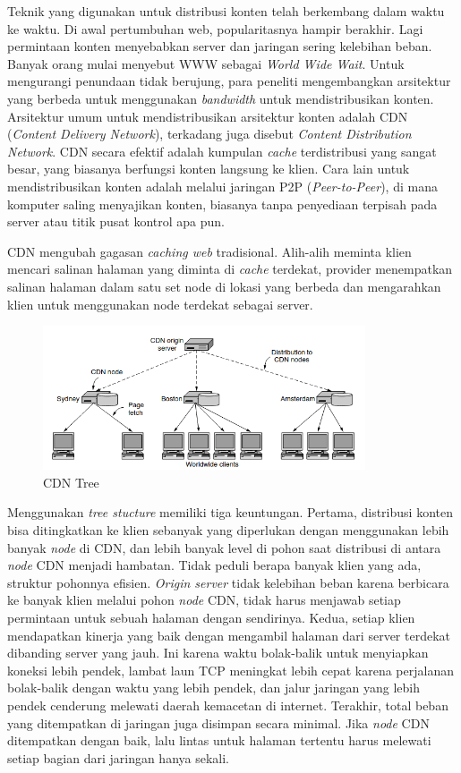 Teknik yang digunakan untuk distribusi konten telah berkembang dalam waktu ke waktu. Di awal pertumbuhan web, popularitasnya hampir berakhir. Lagi permintaan konten menyebabkan server dan jaringan sering kelebihan beban. Banyak orang mulai menyebut WWW sebagai \emph{World Wide Wait}. Untuk mengurangi penundaan tidak berujung, para peneliti mengembangkan arsitektur yang berbeda untuk menggunakan \emph{bandwidth} untuk mendistribusikan konten. Arsitektur umum untuk mendistribusikan arsitektur konten adalah CDN (\emph{Content Delivery Network}), terkadang juga disebut \emph{Content Distribution Network}. CDN secara efektif adalah kumpulan \emph{cache} terdistribusi yang sangat besar, yang biasanya berfungsi konten langsung ke klien. Cara lain untuk mendistribusikan konten adalah melalui jaringan P2P (\emph{Peer-to-Peer}), di mana komputer saling menyajikan konten, biasanya tanpa penyediaan terpisah pada server atau titik pusat kontrol apa pun. 

CDN mengubah gagasan \emph{caching web} tradisional. Alih-alih meminta klien mencari salinan halaman yang diminta di \emph{cache} terdekat, provider menempatkan salinan halaman dalam satu set node di lokasi yang berbeda dan mengarahkan klien untuk menggunakan node terdekat sebagai server.

\begin{figure}[H]
  \centering{}
	\includegraphics[width=0.85\textwidth]{gambar/CDN_distribution_tree}
  \caption{CDN Tree}
\end{figure}

Menggunakan \emph{tree stucture} memiliki tiga keuntungan. Pertama, distribusi konten bisa ditingkatkan ke klien sebanyak yang diperlukan dengan menggunakan lebih banyak \emph{node} di CDN, dan lebih banyak level di pohon saat distribusi di antara \emph{node} CDN menjadi hambatan. Tidak peduli berapa banyak klien yang ada, struktur pohonnya efisien. \emph{Origin server} tidak kelebihan beban karena berbicara ke banyak klien melalui pohon \emph{node} CDN, tidak harus menjawab setiap permintaan untuk sebuah halaman dengan sendirinya. Kedua, setiap klien mendapatkan kinerja yang baik dengan mengambil halaman dari server terdekat dibanding server yang jauh. Ini karena waktu bolak-balik untuk menyiapkan koneksi lebih pendek, lambat laun TCP meningkat lebih cepat karena perjalanan bolak-balik dengan waktu yang lebih pendek, dan jalur jaringan yang lebih pendek cenderung melewati daerah kemacetan di internet. Terakhir, total beban yang ditempatkan di jaringan juga disimpan secara minimal. Jika \emph{node} CDN ditempatkan dengan baik, lalu lintas untuk halaman tertentu harus melewati setiap bagian dari jaringan hanya sekali.

